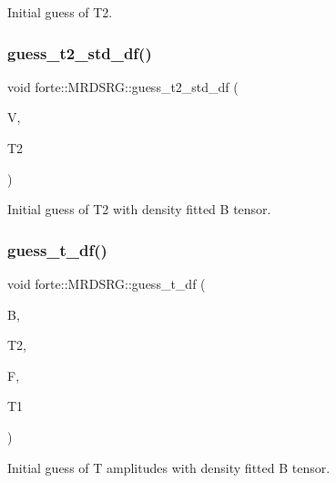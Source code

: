 Initial guess of T2. 

\mbox{\label{classforte_1_1_m_r_d_s_r_g_a651d68d9309967311a41a9e6962df0c8}} 
\subsubsection{\texorpdfstring{guess\+\_\+t2\+\_\+std\+\_\+df()}{guess\_t2\_std\_df()}}
{\footnotesize\ttfamily void forte\+::\+M\+R\+D\+S\+R\+G\+::guess\+\_\+t2\+\_\+std\+\_\+df (\begin{DoxyParamCaption}\item[{Blocked\+Tensor \&}]{V,  }\item[{Blocked\+Tensor \&}]{T2 }\end{DoxyParamCaption})\hspace{0.3cm}{\ttfamily [protected]}}



Initial guess of T2 with density fitted B tensor. 

\mbox{\label{classforte_1_1_m_r_d_s_r_g_a4d74d0ac10cc8a26e00659b15e6fb9a6}} 
\subsubsection{\texorpdfstring{guess\+\_\+t\+\_\+df()}{guess\_t\_df()}}
{\footnotesize\ttfamily void forte\+::\+M\+R\+D\+S\+R\+G\+::guess\+\_\+t\+\_\+df (\begin{DoxyParamCaption}\item[{Blocked\+Tensor \&}]{B,  }\item[{Blocked\+Tensor \&}]{T2,  }\item[{Blocked\+Tensor \&}]{F,  }\item[{Blocked\+Tensor \&}]{T1 }\end{DoxyParamCaption})\hspace{0.3cm}{\ttfamily [protected]}}



Initial guess of T amplitudes with density fitted B tensor. 

